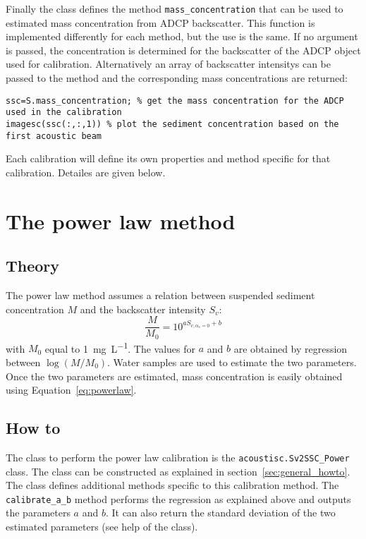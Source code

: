 \documentclass[]{article}
\begin{document}
Finally the class defines the method \lstinline!mass_concentration! that can be used to estimated mass concentration from ADCP backscatter. This function is implemented differently for each method, but the use is the same. If no argument is passed, the concentration is determined for the backscatter of the ADCP object used for calibration. Alternatively an array of backscatter intensitys can be passed to the method and the corresponding mass concentrations are returned:
\begin{lstlisting}
ssc=S.mass_concentration; % get the mass concentration for the ADCP used in the calibration
imagesc(ssc(:,:,1)) % plot the sediment concentration based on the first acoustic beam
\end{lstlisting}

Each calibration will define its own properties and method specific for that calibration. Detailes are given below.
\section{The power law method}
\subsection{Theory}
The power law method assumes a relation between suspended sediment concentration $M$ and the backscatter intensity $S_v$:
\begin{equation}
  \frac{M}{M_0}=10^{aS_{v,\alpha_s=0}+b}
  \label{eq:powerlaw}
\end{equation}
with $M_0$ equal to \SI{1}{\milli\g\per\liter}. The values for $a$ and $b$ are obtained by regression between $\log(M/M_0)$. Water samples are used to estimate the two parameters. Once the two parameters are estimated, mass concentration is easily obtained using Equation~\ref{eq:powerlaw}.

\subsection{How to}
The class to perform the power law calibration is the \lstinline!acoustisc.Sv2SSC_Power! class. The class can be constructed as explained in section~\ref{sec:general_howto}. The class defines additional methods specific to this calibration method. The \lstinline!calibrate_a_b! method performs the regression as explained above and outputs the parameters $a$ and $b$. It can also return the standard deviation of the two estimated parameters (see help of the class). 
\end{document}
